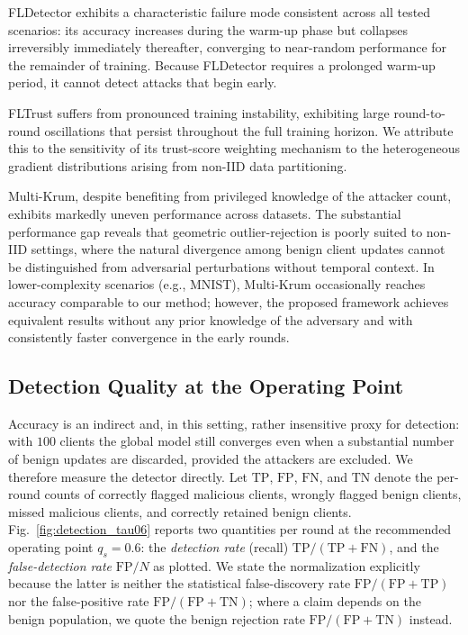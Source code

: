 \documentclass[journal]{IEEEtran}
\begin{document}
FLDetector exhibits a characteristic failure mode consistent across all tested scenarios: its accuracy increases during the warm-up phase but collapses irreversibly immediately thereafter, converging to near-random performance for the remainder of training. Because FLDetector requires a prolonged warm-up period, it cannot detect attacks that begin early.

FLTrust suffers from pronounced training instability, exhibiting large round-to-round oscillations that persist throughout the full training horizon. We attribute this to the sensitivity of its trust-score weighting mechanism to the heterogeneous gradient distributions arising from non-IID data partitioning.

Multi-Krum, despite benefiting from privileged knowledge of the attacker count, exhibits markedly uneven performance across datasets. The substantial performance gap reveals that geometric outlier-rejection is poorly suited to non-IID settings, where the natural divergence among benign client updates cannot be distinguished from adversarial perturbations without temporal context. In lower-complexity scenarios (e.g., MNIST), Multi-Krum occasionally reaches accuracy comparable to our method; however, the proposed framework achieves equivalent results without any prior knowledge of the adversary and with consistently faster convergence in the early rounds.



\subsection{Detection Quality at the Operating Point}
\label{sec:detection_quality}

Accuracy is an indirect and, in this setting, rather insensitive proxy for detection: with $100$ clients the global model still converges even when a substantial number of benign updates are discarded, provided the attackers are excluded. We therefore measure the detector directly. Let $\mathrm{TP}$, $\mathrm{FP}$, $\mathrm{FN}$, and $\mathrm{TN}$ denote the per-round counts of correctly flagged malicious clients, wrongly flagged benign clients, missed malicious clients, and correctly retained benign clients. Fig.~\ref{fig:detection_tau06} reports two quantities per round at the recommended operating point $q_s = 0.6$: the \emph{detection rate} (recall) $\mathrm{TP}/(\mathrm{TP}+\mathrm{FN})$, and the \emph{false-detection rate} $\mathrm{FP}/N$ as plotted. We state the normalization explicitly because the latter is neither the statistical false-discovery rate $\mathrm{FP}/(\mathrm{FP}+\mathrm{TP})$ nor the false-positive rate $\mathrm{FP}/(\mathrm{FP}+\mathrm{TN})$; where a claim depends on the benign population, we quote the benign rejection rate $\mathrm{FP}/(\mathrm{FP}+\mathrm{TN})$ instead.
\end{document}

